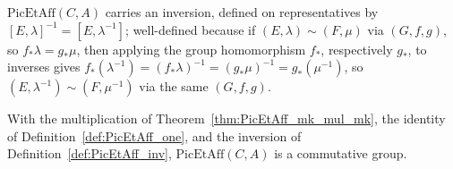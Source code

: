 \begin{definition}[Inverse]
  \label{def:PicEtAff_inv}
  \leanok
  \(\mathrm{PicEtAff}(C,A)\) carries an inversion, defined on representatives by
  \([E,\lambda]^{-1} = [E,\lambda^{-1}]\); well-defined because if \((E,\lambda) \sim (F,\mu)\)
  via \((G,f,g)\), so \(f_{*}\lambda = g_{*}\mu\), then applying the group homomorphism
  \(f_{*}\), respectively \(g_{*}\), to inverses gives \(f_{*}(\lambda^{-1}) =
  (f_{*}\lambda)^{-1} = (g_{*}\mu)^{-1} = g_{*}(\mu^{-1})\), so \((E,\lambda^{-1}) \sim
  (F,\mu^{-1})\) via the same \((G,f,g)\).
\end{definition}

\begin{theorem}
  \label{thm:PicEtAff_commGroup}
  \leanok
  With the multiplication of Theorem~\ref{thm:PicEtAff_mk_mul_mk}, the identity of
  Definition~\ref{def:PicEtAff_one}, and the inversion of Definition~\ref{def:PicEtAff_inv},
  \(\mathrm{PicEtAff}(C,A)\) is a commutative group.
\end{theorem}
